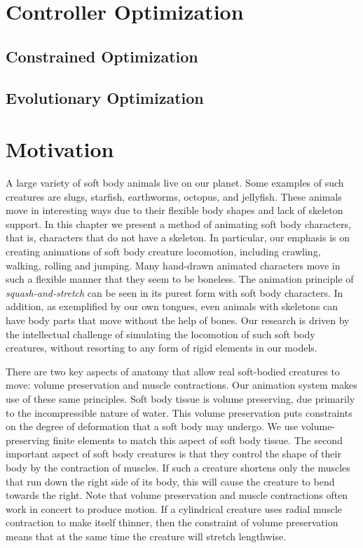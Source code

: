\section{Controller Optimization}
\subsection{Constrained Optimization}
\subsection{Evolutionary Optimization}

\section{Motivation}

A large variety of soft body animals live on our planet. Some examples of
such creatures are slugs, starfish, earthworms, octopus, and jellyfish. These
animals move in interesting ways due to their flexible body shapes and lack of
skeleton support. In this chapter we present a method of animating soft body characters, that
is, characters that do not have a skeleton.  In particular, our emphasis
is on creating animations of soft body creature locomotion, including
crawling, walking, rolling and jumping.  
Many hand-drawn animated characters move in such a flexible
manner that they seem to be boneless.  The animation principle of
\emph{squash-and-stretch} can be seen in its purest form with soft body
characters. In addition, as exemplified by our own tongues, even animals with
skeletons can have body parts that move without the help of
bones.  Our research is driven by the intellectual challenge of
simulating the locomotion of such soft body creatures, without resorting
to any form of rigid elements in our models.

There are two key aspects of anatomy that allow real soft-bodied creatures
to move: volume preservation and muscle contractions.  Our animation
system makes use of these same principles.  Soft body tissue is volume
preserving, due primarily to the incompressible nature of water.  This
volume preservation puts constraints on the degree of deformation that a
soft body may undergo.  We use volume-preserving finite elements to match
this aspect of soft body tissue.  The second important aspect of soft body
creatures is that they control the shape of their body by the contraction of
muscles.  If such a creature shortens only the muscles that run down the
right side of its body, this will cause the creature to bend towards the
right.  Note that volume preservation and muscle contractions often work
in concert to produce motion.  If a cylindrical creature uses radial
muscle contraction to make itself thinner, then the constraint of volume
preservation means that at the same time the creature will stretch
lengthwise.

